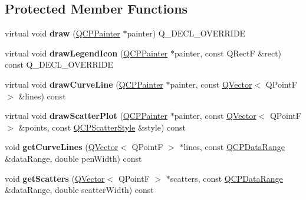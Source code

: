 \subsection*{Protected Member Functions}
\begin{DoxyCompactItemize}
\item 
virtual void {\bfseries draw} (\hyperlink{class_q_c_p_painter}{Q\+C\+P\+Painter} $\ast$painter) Q\+\_\+\+D\+E\+C\+L\+\_\+\+O\+V\+E\+R\+R\+I\+DE\hypertarget{class_q_c_p_curve_ac199d41d23865cd68bd7b598308a4433}{}\label{class_q_c_p_curve_ac199d41d23865cd68bd7b598308a4433}

\item 
virtual void {\bfseries draw\+Legend\+Icon} (\hyperlink{class_q_c_p_painter}{Q\+C\+P\+Painter} $\ast$painter, const Q\+RectF \&rect) const Q\+\_\+\+D\+E\+C\+L\+\_\+\+O\+V\+E\+R\+R\+I\+DE\hypertarget{class_q_c_p_curve_aac6e94afbce4002d2cd7793250154e84}{}\label{class_q_c_p_curve_aac6e94afbce4002d2cd7793250154e84}

\item 
virtual void {\bfseries draw\+Curve\+Line} (\hyperlink{class_q_c_p_painter}{Q\+C\+P\+Painter} $\ast$painter, const \hyperlink{class_q_vector}{Q\+Vector}$<$ Q\+PointF $>$ \&lines) const \hypertarget{class_q_c_p_curve_a2d657f89bfb5a5da35a063dca997c583}{}\label{class_q_c_p_curve_a2d657f89bfb5a5da35a063dca997c583}

\item 
virtual void {\bfseries draw\+Scatter\+Plot} (\hyperlink{class_q_c_p_painter}{Q\+C\+P\+Painter} $\ast$painter, const \hyperlink{class_q_vector}{Q\+Vector}$<$ Q\+PointF $>$ \&points, const \hyperlink{class_q_c_p_scatter_style}{Q\+C\+P\+Scatter\+Style} \&style) const \hypertarget{class_q_c_p_curve_a783b6188a81617380534e41539f55ed3}{}\label{class_q_c_p_curve_a783b6188a81617380534e41539f55ed3}

\item 
void {\bfseries get\+Curve\+Lines} (\hyperlink{class_q_vector}{Q\+Vector}$<$ Q\+PointF $>$ $\ast$lines, const \hyperlink{class_q_c_p_data_range}{Q\+C\+P\+Data\+Range} \&data\+Range, double pen\+Width) const \hypertarget{class_q_c_p_curve_a90999a3378969ed08046395fa8fab37b}{}\label{class_q_c_p_curve_a90999a3378969ed08046395fa8fab37b}

\item 
void {\bfseries get\+Scatters} (\hyperlink{class_q_vector}{Q\+Vector}$<$ Q\+PointF $>$ $\ast$scatters, const \hyperlink{class_q_c_p_data_range}{Q\+C\+P\+Data\+Range} \&data\+Range, double scatter\+Width) const \hypertarget{class_q_c_p_curve_aaa0cc6dc484d2fc98ebaee4b121206fa}{}\label{class_q_c_p_curve_aaa0cc6dc484d2fc98ebaee4b121206fa}


\end{DoxyCompactItemize}
